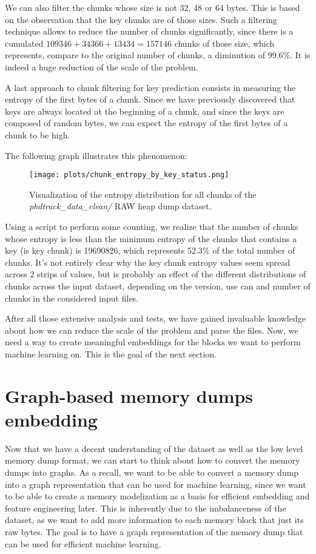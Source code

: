     We can also filter the chunks whose size is not 32, 48 or 64 bytes. This is based on the observation that the key chunks are of those sizes. Such a filtering technique allows to reduce the number of chunks significantly, since there is a cumulated $109346+34366+13434 = 157146$ chunks of those size, which represents, compare to the original number of chunks, a diminution of 99.6\%. It is indeed a huge reduction of the scale of the problem.

    A last approach to chunk filtering for key prediction consists in measuring the entropy of the first bytes of a chunk. Since we have previously discovered that keys are always located at the beginning of a chunk, and since the keys are composed of random bytes, we can expect the entropy of the first bytes of a chunk to be high.

    The following graph illustrates this phenomenon:

    \begin{figure}[H]\label{methods:entropy_of_all_chunks}
        \centering
        \texttt{[image: plots/chunk\_entropy\_by\_key\_status.png]}
        \caption{Visualization of the entropy distribution for all chunks of the \textit{phdtrack\_data\_clean/} RAW heap dump dataset.}
    \end{figure}

    Using a script to perform some counting, we realize that the number of chunks whose entropy is less than the minimum entropy of the chunks that contains a key (is key chunk) is 19690826, which represents 52.3\% of the total number of chunks. It's not entirely clear why the key chunk entropy values seem spread across 2 strips of values, but is probably an effect of the different distributions of chunks across the input dataset, depending on the version, use can and number of chunks in the considered input files.

    After all those extensive analysis and tests, we have gained invaluable knowledge about how we can reduce the scale of the problem and parse the files. Now, we need a way to create meaningful embeddings for the blocks we want to perform machine learning on. This is the goal of the next section.

\section{Graph-based memory dumps embedding}\label{chap:mem_2_graph}
Now that we have a decent understanding of the dataset as well as the low level memory dump format, we can start to think about how to convert the memory dumps into graphs. As a recall, we want to be able to convert a memory dump into a graph representation that can be used for machine learning, since we want to be able to create a memory modelization as a basis for efficient embedding and feature engineering later. This is inherently due to the imbalanceness of the dataset, as we want to add more information to each memory block that just its raw bytes. The goal is to have a graph representation of the memory dump that can be used for efficient machine learning.

